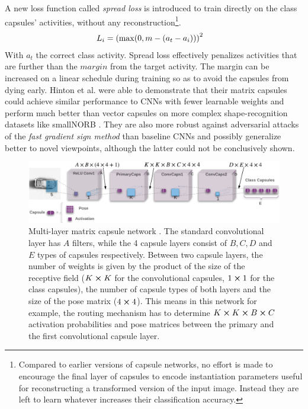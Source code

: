 A new loss function called \emph{spread loss} is introduced to train directly on the class capsules' activities, without any reconstruction\footnote{Compared to earlier versions of capsule networks, no effort is made to encourage the final layer of capsules to encode instantiation parameters useful for reconstructing a transformed version of the input image. Instead they are left to learn whatever increases their classification accuracy.}.
\begin{align}
    L_i &= \qty(\max(0,m-\qty(a_t-a_i)))^2
\end{align}
With $a_t$ the correct class activity. Spread loss effectively penalizes activities that are further than the $margin$ from the target activity. The margin can be increased on a linear schedule during training so as to avoid the capsules from dying early. Hinton et al. were able to demonstrate that their matrix capsules could achieve similar performance to CNNs with fewer learnable weights and perform much better than vector capsules on more complex shape-recognition datasets like smallNORB \cite{lecun2004learning}. They are also more robust against adversarial attacks of the \emph{fast gradient sign method} than baseline CNNs and possibly generalize better to novel viewpoints, although the latter could not be conclusively shown.
\begin{figure}
    \centering
    \includegraphics[width=\textwidth]{figures/matrix-capsules.png}
\caption[Multi-layer matrix capsule network]{Multi-layer matrix capsule network \cite{hinton2018matrix}. The standard convolutional layer has $A$ filters, while the 4 capsule layers consist of $B,C,D$ and $E$ types of capsules respectively. Between two capsule layers, the number of weights is given by the product of the size of the receptive field ($K\cross K$ for the convolutional capsules, $1\cross 1$ for the class capsules), the number of capsule types of both layers and the size of the pose matrix ($4\cross 4$). This means in this network for example, the routing mechanism has to determine $K\cross K\cross B\cross C$ activation probabilities and pose matrices between the primary and the first convolutional capsule layer.}\label{fig:matrix-capsules}
\end{figure}\noindent